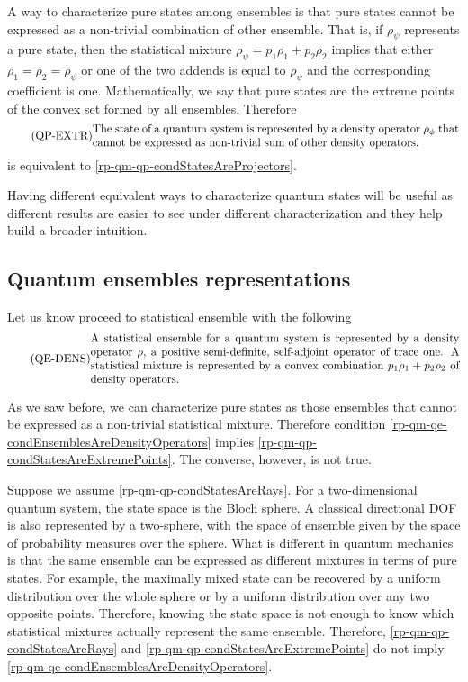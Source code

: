 A way to characterize pure states among ensembles is that pure states cannot be expressed as a non-trivial combination of other ensemble. That is, if $\rho_{\psi}$ represents a pure state, then the statistical mixture $\rho_{\psi} = p_1 \rho_1 + p_2 \rho_2$ implies that either $\rho_1=\rho_2=\rho_{\psi}$ or one of the two addends is equal to $\rho_{\psi}$ and the corresponding coefficient is one. Mathematically, we say that pure states are the extreme points of the convex set formed by all ensembles. Therefore 
\begin{equation}\label{rp-qm-qp-condStatesAreExtremePoints}
	\tag{QP-EXTR}
	\eqtext{The state of a quantum system is represented by a density operator $\rho_{\phi}$ that cannot be expressed as non-trivial sum of other density operators.}
\end{equation}
is equivalent to \ref{rp-qm-qp-condStatesAreProjectors}.

Having different equivalent ways to characterize quantum states will be useful as different results are easier to see under different characterization and they help build a broader intuition.

\subsection{Quantum ensembles representations}

Let us know proceed to statistical ensemble with the following
\begin{equation}\label{rp-qm-qe-condEnsemblesAreDensityOperators}
	\tag{QE-DENS}
	\eqtext{A statistical ensemble for a quantum system is represented by a density operator $\rho$, a positive semi-definite, self-adjoint operator of trace one. A statistical mixture is represented by a convex combination $p_1 \rho_1 + p_2 \rho_2$ of density operators.}
\end{equation}

As we saw before, we can characterize pure states as those ensembles that cannot be expressed as a non-trivial statistical mixture. Therefore condition \ref{rp-qm-qe-condEnsemblesAreDensityOperators} implies \ref{rp-qm-qp-condStatesAreExtremePoints}. The converse, however, is not true.

Suppose we assume \ref{rp-qm-qp-condStatesAreRays}. For a two-dimensional quantum system, the state space is the Bloch sphere. A classical directional DOF is also represented by a two-sphere, with the space of ensemble given by the space of probability measures over the sphere. What is different in quantum mechanics is that the same ensemble can be expressed as different mixtures in terms of pure states. For example, the maximally mixed state can be recovered by a uniform distribution over the whole sphere or by a uniform distribution over any two opposite points. Therefore, knowing the state space is not enough to know which statistical mixtures actually represent the same ensemble. Therefore, \ref{rp-qm-qp-condStatesAreRays} and \ref{rp-qm-qp-condStatesAreExtremePoints} do not imply \ref{rp-qm-qe-condEnsemblesAreDensityOperators}.

